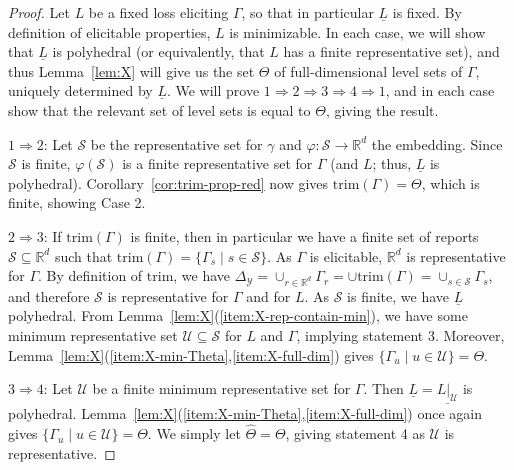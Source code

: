 \documentclass[11pt]{article}
\newcommand{\Comments}{1}
\newcommand{\mytodo}[2]{\ifnum\Comments=1%
  \todo[linecolor=#1!80!black,backgroundcolor=#1,bordercolor=#1!80!black]{#2}\fi}
\newcommand{\raft}[1]{\mytodo{green!20!white}{RF: #1}}
\newcommand{\jessiet}[1]{\mytodo{teal!20!white}{JF: #1}}
\newcommand{\reals}{\mathbb{R}}
\newcommand{\simplex}{\Delta_\Y}
\newcommand{\Sc}{\mathcal{S}}
\newcommand{\U}{\mathcal{U}}
\newcommand{\Y}{\mathcal{Y}}
\newcommand{\risk}[1]{\underline{#1}}
\newcommand{\trimred}{\mathrm{trim}}
\begin{document}
\begin{proof}
  Let $L$ be a fixed loss eliciting $\Gamma$, so that in particular $\risk L$ is fixed.
  By definition of elicitable properties, $L$ is minimizable.
  In each case, we will show that $\risk L$ is polyhedral (or equivalently, that $L$ has a finite representative set), and thus Lemma~\ref{lem:X} will give us the set $\Theta$ of full-dimensional level sets of $\Gamma$, uniquely determined by $\risk L$.
  We will prove $1 \Rightarrow 2 \Rightarrow 3 \Rightarrow 4 \Rightarrow 1$, and in each case show that the relevant set of level sets is equal to $\Theta$, giving the result.

  $1 \Rightarrow 2$:
  Let $\Sc$ be the representative set for $\gamma$ and $\varphi:\Sc\to\reals^d$ the embedding.
  Since $\Sc$ is finite, $\varphi(\Sc)$ is a finite representative set for $\Gamma$ (and $L$; thus, $\risk L$ is polyhedral).
  Corollary~\ref{cor:trim-prop-red} now gives $\trimred(\Gamma) = \Theta$, which is finite, showing Case 2.

  $2 \Rightarrow 3$:
  If $\trimred(\Gamma)$ is finite, then in particular we have a finite set of reports $\Sc \subseteq \reals^d$ such that $\trimred(\Gamma) = \{\Gamma_s \mid s\in\Sc\}$.
  As $\Gamma$ is elicitable, $\reals^d$ is representative for $\Gamma$.
  By definition of $\trimred$, we have $\simplex = \cup_{r\in\reals^d} \Gamma_r = \cup \trimred(\Gamma) = \cup_{s\in\Sc} \Gamma_s$, and therefore $\Sc$ is representative for $\Gamma$ and for $L$.
  As $\Sc$ is finite, we have $\risk L$ polyhedral.
  From Lemma~\ref{lem:X}(\ref{item:X-rep-contain-min}), we have some minimum representative set $\U\subseteq\Sc$ for $L$ and $\Gamma$, implying statement 3.
  Moreover, Lemma~\ref{lem:X}(\ref{item:X-min-Theta},\ref{item:X-full-dim}) gives $\{\Gamma_u \mid u\in\U\} = \Theta$.

  $3 \Rightarrow 4$:
  Let $\U$ be a finite minimum representative set for $\Gamma$.
  Then $\risk L = \risk{L|_\U}$ is polyhedral.
  Lemma~\ref{lem:X}(\ref{item:X-min-Theta},\ref{item:X-full-dim}) once again gives $\{\Gamma_u \mid u\in\U\} = \Theta$.
  We simply let $\hat\Theta = \Theta$, giving statement 4 as $\U$ is representative.


\end{proof}
\end{document}

